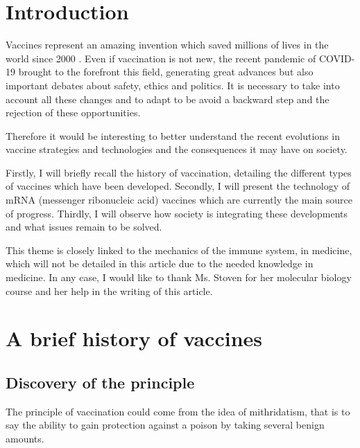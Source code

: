 \documentclass{article}
\begin{document}
    

    \section{Introduction}

    Vaccines represent an amazing invention which saved millions of lives in the world since 2000 \autocite{HowManyLives2021}.
    Even if vaccination is not new, the recent pandemic of COVID-19 brought to the forefront this field, generating great advances but also important debates about safety, ethics and politics.
    It is necessary to take into account all these changes and to adapt to be avoid a backward step and the rejection of these opportunities. 
    
    Therefore it would be interesting to better understand the recent evolutions in vaccine strategies and technologies and the consequences it may have on society.
    
    Firstly, I will briefly recall the history of vaccination, detailing the different types of vaccines which have been developed.
    Secondly, I will present the technology of mRNA (messenger ribonucleic acid) vaccines which are currently the main source of progress.
    Thirdly, I will observe how society is integrating these developments and what issues remain to be solved.

    This theme is closely linked to the mechanics of the immune system, in medicine, which will not be detailed in this article due to the needed knowledge in medicine.
    In any case, I would like to thank Ms. Stoven for her molecular biology course and her help in the writing of this article.


    \section{A brief history of vaccines}

        \subsection{Discovery of the principle}

            The principle of vaccination could come from the idea of mithridatism, that is to say the ability to gain protection against a poison by taking several benign amounts.
            
\end{document}

